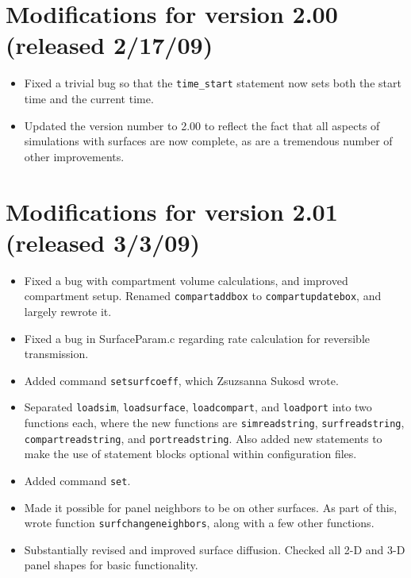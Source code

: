 \documentclass {scrbook}
\newcommand {\ttt} {\texttt}
\begin{document}
\section{Modifications for version 2.00 (released 2/17/09)}
\begin{itemize}
\item Fixed a trivial bug so that the \ttt{time\_start} statement now sets both the start time and the current time.
\item Updated the version number to 2.00 to reflect the fact that all aspects of simulations with surfaces are now complete, as are a tremendous number of other improvements.
\end{itemize}

\section{Modifications for version 2.01 (released 3/3/09)}
\begin{itemize}
\item Fixed a bug with compartment volume calculations, and improved compartment setup. Renamed \ttt{compartaddbox} to \ttt{compartupdatebox}, and largely rewrote it.
\item Fixed a bug in SurfaceParam.c regarding rate calculation for reversible transmission.
\item Added command \ttt{setsurfcoeff}, which Zsuzsanna Sukosd wrote.
\item Separated \ttt{loadsim}, \ttt{loadsurface}, \ttt{loadcompart}, and \ttt{loadport} into two functions each, where the new functions are \ttt{simreadstring}, \ttt{surfreadstring}, \ttt{compartreadstring}, and \ttt{portreadstring}. Also added new statements to make the use of statement blocks optional within configuration files.
\item Added command \ttt{set}.
\item Made it possible for panel neighbors to be on other surfaces. As part of this, wrote function \ttt{surfchangeneighbors}, along with a few other functions.
\item Substantially revised and improved surface diffusion. Checked all 2-D and 3-D panel shapes for basic functionality.
\end{itemize}
\end{document}
